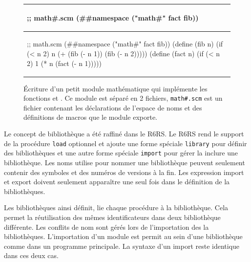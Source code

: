 \begin{center}
  \begin{figure}[h]
  \begin{tabular}{|l|}
\hline
\begin{mplisting}{0.5}
;; math#.scm
(##namespace ("math#" fact fib))
\end{mplisting} \\\hline
\begin{mplisting}{0.6}
;; math.scm
(##namespace ("math#" fact fib))
(define (fib n)
  (if (< n 2)
    n
    (+ (fib (- n 1)) (fib (- n 2)))))
(define (fact n)
  (if (< n 2)
    1
    (* n (fact (- n 1)))))
\end{mplisting}\\\hline
  \end{tabular}
  \caption{Écriture d'un petit module mathématique qui implémente les fonctions 
    et . Ce module est séparé en 2 fichiers, \texttt{math\#.scm} est un fichier
    contenant les déclarations de l'espace de noms et des définitions de macros que le module
    exporte.}
  \label{fig:math_module1}
\end{figure}
\end{center}


Le concept de bibliothèque a été raffiné  dans le R6RS.  Le R6RS rend le
support de la procédure \texttt{load} optionnel et ajoute une forme spéciale
\texttt{library} pour définir des bibliothèques et une autre forme spéciale
\texttt{import} pour gérer la inclure une bibliothèque.  Les noms utilise
pour nommer une bibliothèque peuvent seulement contenir des symboles et des
numéros de versions à la fin. Les expression import et export doivent seulement
apparaître une seul fois dans le définition de la bibliothèques.

Les bibliothèques ainsi définit, lie chaque procédure à la bibliothèque.  Cela
permet la réutilisation des mêmes identificateurs dans deux bibliothèque
différente.  Les conflits de nom sont gérés lors de l'importation des la
bibliothèques. L'importation d'un module est permit au sein d'une bibliothèque
comme dans un programme principale. La syntaxe d'un import reste identique dans
ces deux cas.


